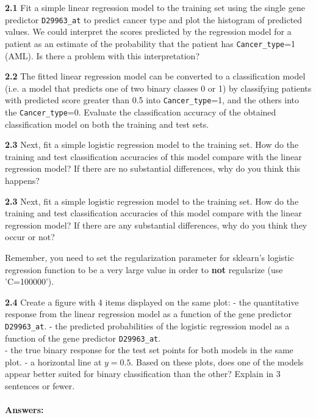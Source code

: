 \documentclass[11pt]{article}
\begin{document}
\textbf{2.1} Fit a simple linear regression model to the training set
using the single gene predictor \texttt{D29963\_at} to predict cancer
type and plot the histogram of predicted values. We could interpret the
scores predicted by the regression model for a patient as an estimate of
the probability that the patient has \texttt{Cancer\_type}=1 (AML). Is
there a problem with this interpretation?

\textbf{2.2} The fitted linear regression model can be converted to a
classification model (i.e. a model that predicts one of two binary
classes 0 or 1) by classifying patients with predicted score greater
than 0.5 into \texttt{Cancer\_type}=1, and the others into the
\texttt{Cancer\_type}=0. Evaluate the classification accuracy of the
obtained classification model on both the training and test sets.

\textbf{2.3} Next, fit a simple logistic regression model to the
training set. How do the training and test classification accuracies of
this model compare with the linear regression model? If there are no
substantial differences, why do you think this happens?

\textbf{2.3} Next, fit a simple logistic regression model to the
training set. How do the training and test classification accuracies of
this model compare with the linear regression model? If there are any
substantial differences, why do you think they occur or not?

Remember, you need to set the regularization parameter for sklearn's
logistic regression function to be a very large value in order to
\textbf{not} regularize (use 'C=100000').

\textbf{2.4} Create a figure with 4 items displayed on the same plot: -
the quantitative response from the linear regression model as a function
of the gene predictor \texttt{D29963\_at}. - the predicted probabilities
of the logistic regression model as a function of the gene predictor
\texttt{D29963\_at}.\\
- the true binary response for the test set points for both models in
the same plot. - a horizontal line at \(y=0.5\). Based on these plots,
does one of the models appear better suited for binary classification
than the other? Explain in 3 sentences or fewer.

    \paragraph{Answers:}\label{answers}
\end{document}
